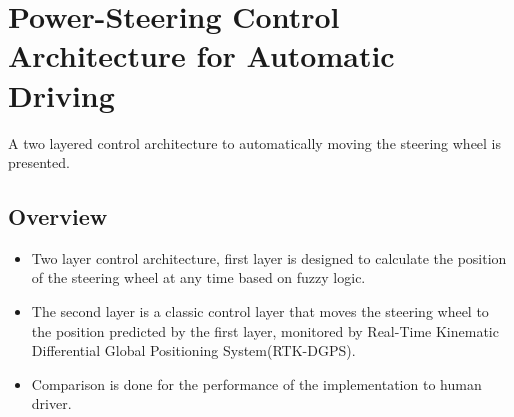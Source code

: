 \section{Power-Steering Control Architecture for Automatic Driving}
A two layered control architecture to automatically moving the steering wheel is presented.\\
\subsection*{Overview}
\begin{itemize}
	\item Two layer control architecture, first layer is designed to calculate the position of the steering wheel at any time based on fuzzy logic.
	\item The second layer is a classic control layer that moves the steering wheel to the position predicted by the first layer, monitored by Real-Time Kinematic Differential Global Positioning System(RTK-DGPS).
	\item Comparison is done for the performance of the implementation to human driver. 
\end{itemize}


